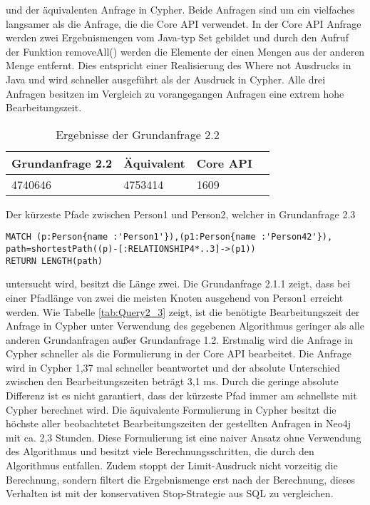  und der äquivalenten Anfrage in Cypher. Beide Anfragen sind um ein vielfaches langsamer als die Anfrage, die die Core API verwendet. In der Core API Anfrage werden zwei Ergebnismengen vom Java-typ Set gebildet und durch den Aufruf der Funktion removeAll() werden die Elemente der einen Mengen aus der anderen Menge entfernt. Dies entspricht einer Realisierung des Where not Ausdrucks in Java und wird schneller ausgeführt als der Ausdruck in Cypher. Alle drei Anfragen besitzen im Vergleich zu vorangegangen Anfragen eine extrem hohe Bearbeitungszeit.
\FloatBarrier
\begin{table}[h]
	\centering
		\begin{tabular}{ |p{3cm}|p{3cm}|p{3cm}|p{3cm}|  }
			\hline
			Grundanfrage 2.2 & Äquivalent&Core API\\
			\hline
			4740646    & 4753414 &  1609\\
			\hline
		\end{tabular}
		\caption{Ergebnisse der Grundanfrage 2.2}
		\label{tab:Query2_2}
\end{table}
\FloatBarrier
\noindent Der kürzeste Pfade zwischen Person1 und Person2, welcher in Grundanfrage 2.3
\begin{Verbatim}[frame=single]
MATCH (p:Person{name :'Person1'}),(p1:Person{name :'Person42'}),
path=shortestPath((p)-[:RELATIONSHIP4*..3]->(p1)) 
RETURN LENGTH(path)
\end{Verbatim} 
 untersucht wird, besitzt die Länge zwei. Die Grundanfrage 2.1.1 zeigt, dass bei einer Pfadlänge von zwei die meisten Knoten ausgehend von Person1 erreicht werden. Wie Tabelle \ref{tab:Query2_3} zeigt, ist die benötigte Bearbeitungszeit der Anfrage in Cypher unter Verwendung des gegebenen Algorithmus geringer als alle anderen Grundanfragen außer Grundanfrage 1.2. Erstmalig wird die Anfrage in Cypher schneller als die Formulierung in der Core API bearbeitet. Die Anfrage wird in Cypher 1,37 mal schneller beantwortet und  der absolute Unterschied zwischen den Bearbeitungszeiten beträgt 3,1 ms. Durch die geringe absolute Differenz ist es nicht garantiert, dass der kürzeste Pfad immer am schnellste mit Cypher berechnet wird. \newline
Die äquivalente Formulierung in Cypher besitzt die höchste aller beobachtetet Bearbeitungszeiten der gestellten Anfragen in Neo4j mit ca. 2,3 Stunden. Diese Formulierung ist eine naiver Ansatz ohne Verwendung des Algorithmus und besitzt viele Berechnungsschritten, die durch den Algorithmus entfallen. Zudem stoppt der Limit-Ausdruck nicht vorzeitig die Berechnung, sondern filtert die Ergebnismenge erst nach der Berechnung, dieses Verhalten ist mit der konservativen Stop-Strategie aus SQL zu vergleichen\parencite{carey1997saying}.   

